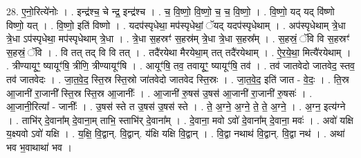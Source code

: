 \documentclass[17pt]{extarticle}
\begin{document}
28. ए॒नो॒रित्ये॑नोः । . इन्द्र॑श्च॒ चे न्द्र॒ इन्द्र॑श्च । . च॒ वि॒ष्णो॒ वि॒ष्णो॒ च॒ च॒ वि॒ष्णो॒ । . वि॒ष्णो॒ यद् यद् वि॑ष्णो विष्णो॒ यत् । . वि॒ष्णो॒ इति॑ विष्णो । . यदप॑स्पृधेथा॒ मप॑स्पृधेथां॒ ॅयद् यदप॑स्पृधेथाम् । . अप॑स्पृधेथाम् त्रे॒धा त्रे॒धा ऽप॑स्पृधेथा॒ मप॑स्पृधेथाम् त्रे॒धा । . त्रे॒धा स॒हस्रꣳ॑ स॒हस्र॑म् त्रे॒धा त्रे॒धा स॒हस्र᳚म् । . स॒हस्रं॒ ॅवि वि स॒हस्रꣳ॑ स॒हस्रं॒ ॅवि । . वि तत् तद् वि वि तत् । . तदै॑रयेथा मैरयेथा॒म् तत् तदै॑रयेथाम् । . ऐ॒र॒ये॒था॒ मित्यै॑रयेथाम् । . त्रीण्यायूꣳ॒॒ ष्यायूꣳ॑षि॒ त्रीणि॒ त्रीण्यायूꣳ॑षि । . आयूꣳ॑षि॒ तव॒ तवायूꣳ॒॒ ष्यायूꣳ॑षि॒ तव॑ । . तव॑ जातवेदो जातवेद॒ स्तव॒ तव॑ जातवेदः । . जा॒त॒वे॒द॒ स्ति॒स्र स्ति॒स्रो जा॑तवेदो जातवेद स्ति॒स्रः । . जा॒त॒वे॒द॒ इति॑ जात - वे॒दः॒ । . ति॒स्र आ॒जानी॑ रा॒जानी᳚ स्ति॒स्र स्ति॒स्र आ॒जानीः᳚ । . आ॒जानी॑ रु॒षस॑ उ॒षस॑ आ॒जानी॑ रा॒जानी॑ रु॒षसः॑ । . आ॒जानी॒रित्या᳚ - जानीः᳚ । . उ॒षस॑ स्ते त उ॒षस॑ उ॒षस॑ स्ते । . ते॒ अ॒ग्ने॒ अ॒ग्ने॒ ते॒ ते॒ अ॒ग्ने॒ । . अ॒ग्न॒ इत्य॑ग्ने । . ताभि॑र् दे॒वाना᳚म् दे॒वाना॒म् ताभि॒ स्ताभि॑र् दे॒वाना᳚म् । . दे॒वाना॒ मवो ऽवो॑ दे॒वाना᳚म् दे॒वाना॒ मवः॑ । . अवो॑ यक्षि य॒क्ष्यवो ऽवो॑ यक्षि । . य॒क्षि॒ वि॒द्वान्. वि॒द्वान्. य॑क्षि यक्षि वि॒द्वान् । . वि॒द्वा नथाथ॑ वि॒द्वान्. वि॒द्वा नथ॑ । . अथा॑ भव भ॒वाथाथा॑ भव । \newline
\end{document}
